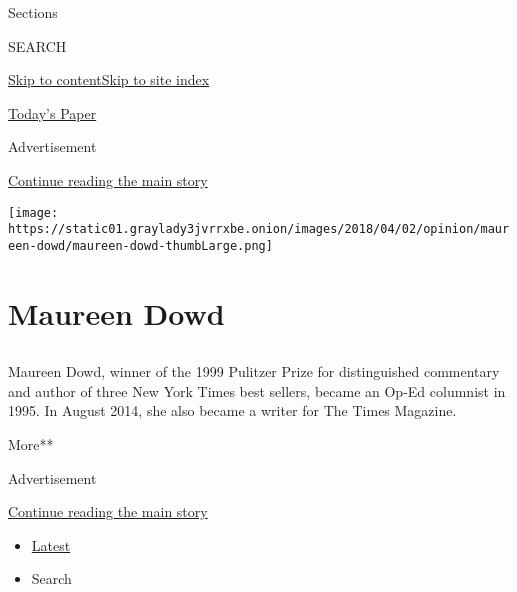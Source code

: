 Sections

SEARCH

\protect\hyperlink{site-content}{Skip to
content}\protect\hyperlink{site-index}{Skip to site index}

\href{https://myaccount.nytimes3xbfgragh.onion/auth/login?response_type=cookie\&client_id=vi}{}

\href{https://www.nytimes3xbfgragh.onion/section/todayspaper}{Today's
Paper}

Advertisement

\protect\hyperlink{after-top}{Continue reading the main story}

\texttt{[image: https://static01.graylady3jvrrxbe.onion/images/2018/04/02/opinion/maureen-dowd/maureen-dowd-thumbLarge.png]}

\hypertarget{maureen-dowd}{%
\section{Maureen Dowd}\label{maureen-dowd}}

\hypertarget{section}{%
\subsection{}\label{section}}

Maureen Dowd, winner of the 1999 Pulitzer Prize for distinguished
commentary and author of three New York Times best sellers, became an
Op-Ed columnist in 1995. In August 2014, she also became a writer for
The Times Magazine.

More**

Advertisement

\protect\hyperlink{after-mid1}{Continue reading the main story}

\begin{itemize}
\tightlist
\item
  \protect\hyperlink{stream-panel}{Latest}
\item
  Search
\end{itemize}

